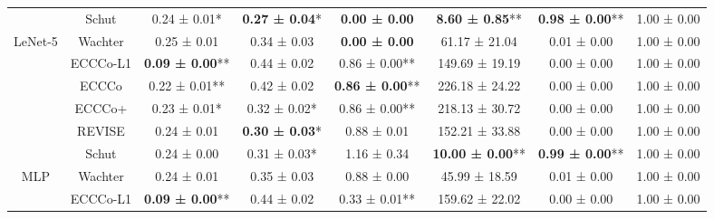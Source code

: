 \begin{table}
{\begin{tabular}[t]{cccccccc}
 & Schut & 0.24 ± 0.01*\hphantom{*} & \textbf{0.27 ± 0.04}*\hphantom{*} & \textbf{0.00 ± 0.00}\hphantom{*}\hphantom{*} & \textbf{8.60 ± 0.85}** & \textbf{0.98 ± 0.00}** & 1.00 ± 0.00\hphantom{*}\hphantom{*}\\

\multirow[t]{-6}{*}{\centering\arraybackslash LeNet-5} & Wachter & 0.25 ± 0.01\hphantom{*}\hphantom{*} & 0.34 ± 0.03\hphantom{*}\hphantom{*} & \textbf{0.00 ± 0.00}\hphantom{*}\hphantom{*} & 61.17 ± 21.04\hphantom{*}\hphantom{*} & 0.01 ± 0.00\hphantom{*}\hphantom{*} & 1.00 ± 0.00\hphantom{*}\hphantom{*}\\
\cmidrule{1-8}
 & ECCCo-L1 & \textbf{0.09 ± 0.00}** & 0.44 ± 0.02\hphantom{*}\hphantom{*} & 0.86 ± 0.00** & 149.69 ± 19.19\hphantom{*}\hphantom{*} & 0.00 ± 0.00\hphantom{*}\hphantom{*} & 1.00 ± 0.00\hphantom{*}\hphantom{*}\\

 & ECCCo & 0.22 ± 0.01** & 0.42 ± 0.02\hphantom{*}\hphantom{*} & \textbf{0.86 ± 0.00}** & 226.18 ± 24.22\hphantom{*}\hphantom{*} & 0.00 ± 0.00\hphantom{*}\hphantom{*} & 1.00 ± 0.00\hphantom{*}\hphantom{*}\\

 & ECCCo+ & 0.23 ± 0.01*\hphantom{*} & 0.32 ± 0.02*\hphantom{*} & 0.86 ± 0.00** & 218.13 ± 30.72\hphantom{*}\hphantom{*} & 0.00 ± 0.00\hphantom{*}\hphantom{*} & 1.00 ± 0.00\hphantom{*}\hphantom{*}\\

 & REVISE & 0.24 ± 0.01\hphantom{*}\hphantom{*} & \textbf{0.30 ± 0.03}*\hphantom{*} & 0.88 ± 0.01\hphantom{*}\hphantom{*} & 152.21 ± 33.88\hphantom{*}\hphantom{*} & 0.00 ± 0.00\hphantom{*}\hphantom{*} & 1.00 ± 0.00\hphantom{*}\hphantom{*}\\

 & Schut & 0.24 ± 0.00\hphantom{*}\hphantom{*} & 0.31 ± 0.03*\hphantom{*} & 1.16 ± 0.34\hphantom{*}\hphantom{*} & \textbf{10.00 ± 0.00}** & \textbf{0.99 ± 0.00}** & 1.00 ± 0.00\hphantom{*}\hphantom{*}\\

\multirow[t]{-6}{*}{\centering\arraybackslash MLP} & Wachter & 0.24 ± 0.01\hphantom{*}\hphantom{*} & 0.35 ± 0.03\hphantom{*}\hphantom{*} & 0.88 ± 0.00\hphantom{*}\hphantom{*} & 45.99 ± 18.59\hphantom{*}\hphantom{*} & 0.01 ± 0.00\hphantom{*}\hphantom{*} & 1.00 ± 0.00\hphantom{*}\hphantom{*}\\
\cmidrule{1-8}
 & ECCCo-L1 & \textbf{0.09 ± 0.00}** & 0.44 ± 0.02\hphantom{*}\hphantom{*} & 0.33 ± 0.01** & 159.62 ± 22.02\hphantom{*}\hphantom{*} & 0.00 ± 0.00\hphantom{*}\hphantom{*} & 1.00 ± 0.00\hphantom{*}\hphantom{*}\\


\end{tabular}}
\end{table}
